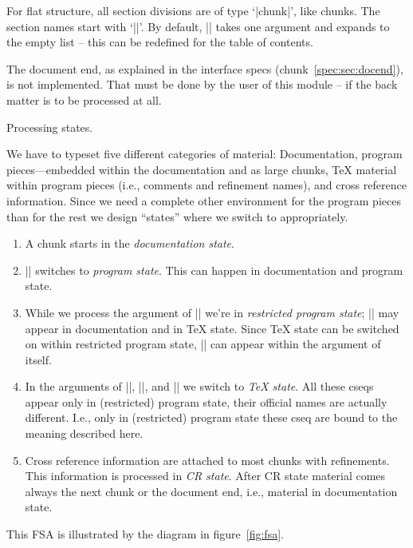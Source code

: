 \documentclass{progltx}
\begin{document}
For flat structure, all section divisions are of type `|chunk|', like
chunks. The section names start with `||'. By
default, |\cwbbRank| takes one argument and expands to the empty list
-- this can be redefined for the table of contents.


\sect The document end, as explained in the \cweave{} interface specs
(chunk~\ref{spec:sec:docend}), is not implemented. That must be done
by the user of this module -- if the back matter is to be processed at
all.




\chap Processing states.

We have to typeset five different categories of material:
Documentation, program pieces---embedded within the documentation and
as large chunks, \TeX{} material within program pieces (i.e., comments
and refinement names), and cross reference information. Since we need
a complete other environment for the program pieces than for the rest
we design ``states'' where we switch to appropriately.
%
\begin{enumerate}

\item A chunk starts in the \textsl{documentation state}.

\item |\B| switches to \textsl{program state}. This can happen in
documentation and program state.

\item While we process the argument of |\PB| we're in \textsl{restricted
program state}; |\PB| may appear in documentation and in \TeX{}
state. Since \TeX{} state can be switched on within restricted
program state, |\PB| can appear within the argument of itself.

\item In the arguments of |\C|, |\SHC|, and |\X| we switch to
\textsl{\TeX{} state}. All these cseqs appear only in (restricted)
program state, their official names are actually different. I.e., only
in (restricted) program state these cseq are bound to the meaning
described here.

\item Cross reference information are attached to most chunks with
refinements. This information is processed in \textsl{CR state}.
After CR state material
comes always the next chunk or the document end, i.e., material in
documentation state.

\end{enumerate}
%
This FSA is illustrated by the diagram in figure~\ref{fig:fsa}.
\end{document}
